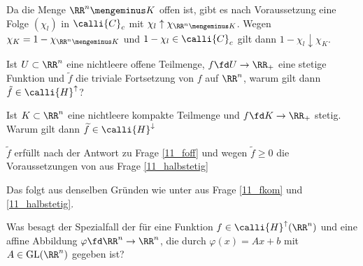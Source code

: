 \begin{antwort}
  Da die Menge $\RR^n\mengeminus K$ offen ist, gibt es nach Voraussetzung 
  eine Folge $(\chi_l)$ in $\calli{C}_c$ mit 
  $\chi_l \uparrow \chi_{\RR^n\mengeminus K}$. Wegen 
  $\chi_K = 1-\chi_{\RR^n\mengeminus K}$ und $1-\chi_l \in \calli{C}_c$ 
  gilt dann $1-\chi_l \downarrow \chi_K$. \AntEnd
\end{antwort} 

\begin{frage}\label{11_bairecharak}
   Ist $U\subset \RR^n$ eine nichtleere offene 
  Teilmenge, $f\fd U\to\RR_+$ eine stetige Funktion und 
  $\tilde{f}$ die triviale Fortsetzung von $f$ auf $\RR^n$,  
  warum gilt dann $\tilde{f}\in \calli{H}^\uparrow$? 

   Ist $K\subset\RR^n$ eine nichtleere kompakte Teilmenge und 
  $f\fd K\to\RR_+$ stetig. Warum gilt dann 
  $\widetilde{f}\in \calli{H}^\downarrow$
\end{frage}

\begin{antwort}
   $\widetilde{f}$ erfüllt nach der Antwort zu Frage \ref{11_foff} 
  und wegen $\widetilde{f}\ge 0$ die Voraussetzungen von  aus Frage 
  \ref{11_halbstetig}

   Das folgt aus denselben Gründen wie unter  aus 
  Frage \ref{11_fkom} und \ref{11_halbstetig}.\AntEnd 
\end{antwort}

\begin{frage}\label{11_trans}
  Was besagt der Spezialfall der 
   für eine Funktion 
  $f \in \calli{H}^\uparrow (\RR^n)$ und eine affine Abbildung 
  $\varphi \fd \RR^n \to \RR^n$, die durch $\varphi(x) = Ax +b$ 
  mit $A\in \mathrm{GL}(\RR^n)$ gegeben ist?
\end{frage}

